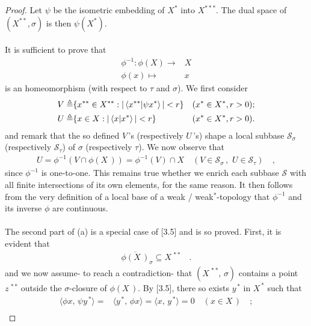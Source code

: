 \begin{proof}
Let $\psi$ be the isometric embedding of $X^\ast$ into $X^{\ast\ast\ast}$. %
The dual space of $(X^{\ast\ast},\sigma)$ is then $\psi(X^\ast)$. \\
\\
%
It is sufficient to prove that
\begin{align}
  \phi^{\minus 1}: \phi(X) \to & X \\
  \phi (x) \mapsto & x 
\end{align}
%
is an homeomorphism (with respect to $\tau$ and $\sigma$). We first consider
\begin{align}
  V \triangleq & \{
      x^{\ast\ast} \in X^{\ast\ast} :  
      \left\lvert\,  \bra{x^{\ast\ast} }\ket{\psi x^\ast} \,\right\rvert < r
    \} & (x^{\ast} \in X^{\ast}, r > 0); \\
  U \triangleq & \{
      x \in X : 
      \left\lvert\,  \bra{x}\ket{x^\ast}  \,\right\rvert < r 
    \} & (x^\ast \in X^\ast, r > 0 ).
\end{align}
and remark that the so defined $V\,$'s (respectively $U\,$'s) shape a local subbase $\mathscr{S}_\sigma$ (respectively $\mathscr{S}_\tau$) of $\sigma$ (respectively $\tau$). We now observe that 
\begin{align}
U=\phi^{\minus 1} \left(V \cap \phi(X\,) \right) = \phi^{\minus 1} (V)  \cap X \quad ( V\in \mathscr{S}_\sigma\,,\,\,U\in \mathscr{S}_\tau) \quad ,
\end{align}
since $\phi^{\minus 1}$ is one-to-one. This remains true whether we enrich each subbase $\mathscr{S}$ with all finite intersections of its own elements, for the same reason. It then follows from the very definition of a local base of a weak / weak$^\ast$-topology that $\phi^{\minus 1}$ and its inverse $\phi$ are continuous.\\
\\
The second part of (a) is a special case of [3.5] and is so proved. First, it is evident that 
\begin{align}
\overline{\phi(X\,)}_\sigma\subseteq X^{\,\ast\ast}\quad .
\end{align}
and we now assume- to reach a contradiction- that $(X^{\,\ast\ast},\, \sigma)$ contains a point $z^{\,\ast\ast}$ outside the $\sigma$-closure of $\phi(X\,)$. By [3.5], there so exists $y^{\,\ast}$ in $X^{\,\ast}$ such that 
\begin{align}
\label{4_1_6} \langle \phi x,\, \psi y^{\,\ast} \rangle=&\langle  y^{\,\ast} ,\,\phi x \rangle= \langle x,\, y^{\,\ast}\rangle= 0\quad (x\in X\,)\quad ; \\

\end{align}
\end{proof}
